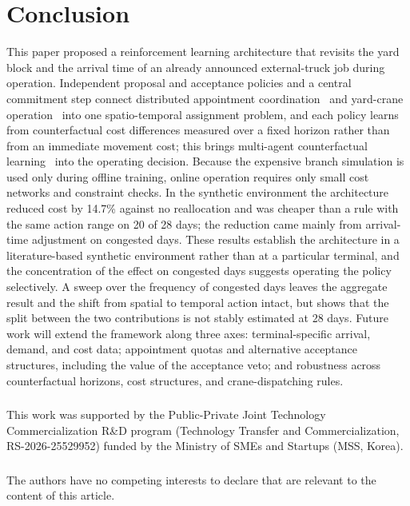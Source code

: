 \documentclass[a4paper]{llncs}
\begin{document}
\section{Conclusion}
\label{sec:concl}
This paper proposed a reinforcement learning architecture that revisits
the yard block and the arrival time of an already announced
external-truck job during operation. Independent proposal and acceptance
policies and a central commitment step connect distributed appointment
coordination~\cite{ref6} and yard-crane operation~\cite{ref7,ref8} into
one spatio-temporal assignment problem, and each policy learns from
counterfactual cost differences measured over a fixed horizon rather
than from an immediate movement cost; this brings multi-agent
counterfactual learning~\cite{ref10,ref11} into the operating decision.
Because the expensive branch simulation is used only during offline
training, online operation requires only small cost networks and
constraint checks. In the synthetic environment the architecture reduced
cost by 14.7\% against no reallocation and was cheaper than a rule with
the same action range on 20 of 28 days; the reduction came mainly from
arrival-time adjustment on congested days.
These results establish the architecture in a literature-based synthetic
environment rather than at a particular terminal, and the concentration
of the effect on congested days suggests operating the policy
selectively. A sweep over the frequency of congested
days leaves the aggregate result and the shift from spatial to temporal
action intact, but shows that the split between the two contributions is
not stably estimated at 28 days. Future work will extend the framework along three axes:
terminal-specific arrival, demand, and cost data; appointment quotas and
alternative acceptance structures, including the value of the acceptance
veto; and robustness across counterfactual horizons, cost structures, and
crane-dispatching rules.

\begin{credits}
\subsubsection{\ackname}
This work was supported by the Public-Private Joint Technology
Commercialization R\&D program (Technology Transfer and
Commercialization, RS-2026-25529952) funded by the Ministry of SMEs and
Startups (MSS, Korea).

\subsubsection{\discintname}
The authors have no competing interests to declare that are relevant to
the content of this article.
\end{credits}
\end{document}
